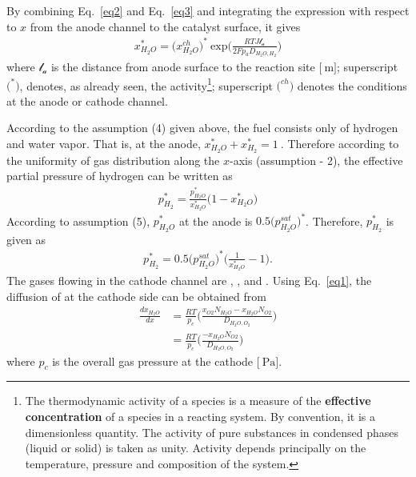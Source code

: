 \documentclass[11pt,a4paper]{article}
\numberwithin{equation}{section}
\theoremstyle{it}
\theoremstyle{definition}
\begin{document}
By combining Eq.~\eqref{eq2} and Eq.~\eqref{eq3} and integrating the expression with respect to $x$ from the anode channel to the catalyst surface, it gives
\begin{equation}\label{eq4}
	\begin{aligned}
		x_{H_2O}^* = \Big(x_{H_2O}^{ch}\Big)^*\ \text{exp} \Big(\frac{RTJ\mathcal{l_a}}{2Fp_aD_{H_2O,H_2}}\Big)
	\end{aligned}
\end{equation}
where $\mathcal{l_a}$ is the distance from anode surface to the reaction site $\Big[\SI{}{\meter}\Big]$; superscript $\Big(^*\Big)$, denotes, as already seen, the activity\footnote{The thermodynamic activity of a species is a measure of the \textbf{effective concentration} of a species in a reacting system. By convention, it is a dimensionless quantity. The activity of pure substances in condensed phases (liquid or solid) is taken as unity. Activity depends principally on the temperature, pressure and composition of the system. 
}; superscript $\Big(^{ch}\Big)$ denotes the conditions at the anode or cathode channel.

According to the assumption (4) given above, the fuel consists only of hydrogen and water vapor. That is, at the anode, $x_{H_2O}^*+x_{H_2}^*=\SI{1}{}$. Therefore according to the uniformity of gas distribution along the $x$-axis (assumption - 2), the effective partial pressure of hydrogen  can be written as
\begin{equation}\label{eq5}
	\begin{aligned}
		p_{H_2}^* = \frac{p_{H_2O}^*}{x_{H_2O}^*} \Big(1-x_{H_2O}^*\Big)
	\end{aligned}
\end{equation}
According to assumption (5), $p_{H_2O}^*$ at the anode is $0.5\Big(p_{H_2O}^{sat}\Big)^*$. Therefore, $p_{H_2}^*$ is given as
\begin{equation}\label{eq6}
	\begin{aligned}
		p_{H_2}^* = 0.5\Big(p_{H_2O}^{sat}\Big)^* \Big(\frac{1}{x_{H_2O}^*}-1\Big).
	\end{aligned}
\end{equation}
The gases flowing in the cathode channel are , ,  and . Using Eq.~\eqref{eq1}, the diffusion of  at the cathode side can be obtained from 
\begin{equation}\label{eq7}
	\begin{aligned}
		\frac{dx_{H_2O}}{dx}&=\frac{RT}{p_c}\Bigg(\frac{x_{O2}N_{H_2O}-x_{H_2O}N_{O2}}{D_{H_2O,O_2}}\Bigg) \\[6pt]
		&= \frac{RT}{p_c}\Bigg(\frac{-x_{H_2O}N_{O2}}{D_{H_2O,O_2}}\Bigg)
	\end{aligned}
\end{equation}
where $p_c$ is the overall gas pressure at the cathode $\Big[\SI{}{\pascal}\Big]$.
\end{document}
